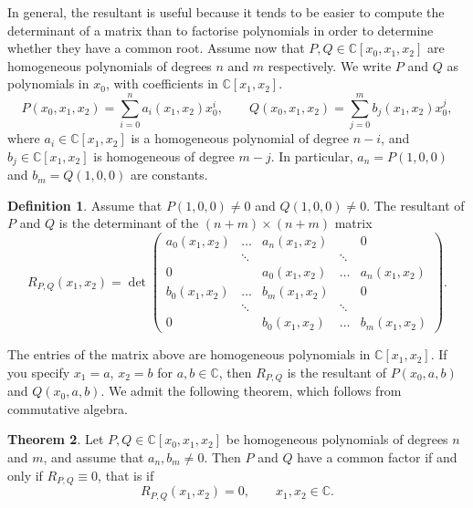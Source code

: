 \documentclass{article}
\newcommand{\C}{\mathbb{C}}
\newcommand{\rb}[1]{\left( #1 \right)}
\renewcommand{\sb}[1]{\left[ #1 \right]}
\theoremstyle{definition}\newtheorem{definition}{Definition}[section]
\theoremstyle{definition}\newtheorem{notation}[definition]{Notation}
\theoremstyle{definition}\newtheorem{remark}[definition]{Remark}
\theoremstyle{definition}\newtheorem{example}[definition]{Example}
\theoremstyle{definition}\newtheorem{fact}{Fact}
\theoremstyle{definition}\newtheorem{exercise}{Exercise}
\newtheorem{theorem}[definition]{Theorem}
\begin{document}

In general, the resultant is useful because it tends to be easier to compute the determinant of a matrix than to factorise polynomials in order to determine whether they have a common root. Assume now that $ P, Q \in \C\sb{x_0, x_1, x_2} $ are homogeneous polynomials of degrees $ n $ and $ m $ respectively. We write $ P $ and $ Q $ as polynomials in $ x_0 $, with coefficients in $ \C\sb{x_1, x_2} $.
$$ P\rb{x_0, x_1, x_2} = \sum_{i = 0}^n a_i\rb{x_1, x_2}x_0^i, \qquad Q\rb{x_0, x_1, x_2} = \sum_{j = 0}^m b_j\rb{x_1, x_2}x_0^j, $$
where $ a_i \in \C\sb{x_1, x_2} $ is a homogeneous polynomial of degree $ n - i $, and $ b_j \in \C\sb{x_1, x_2} $ is homogeneous of degree $ m - j $. In particular, $ a_n = P\rb{1, 0, 0} $ and $ b_m = Q\rb{1, 0, 0} $ are constants.

\begin{definition}
\label{def:9.5}
Assume that $ P\rb{1, 0, 0} \ne 0 $ and $ Q\rb{1, 0, 0} \ne 0 $. The resultant of $ P $ and $ Q $ is the determinant of the $ \rb{n + m} \times \rb{n + m} $ matrix
$$ R_{P, Q}\rb{x_1, x_2} = \det\begin{pmatrix} a_0\rb{x_1, x_2} & \dots & a_n\rb{x_1, x_2} & & 0 \\ & \ddots & & \ddots & \\ 0 & & a_0\rb{x_1, x_2} & \dots & a_n\rb{x_1, x_2} \\ b_0\rb{x_1, x_2} & \dots & b_m\rb{x_1, x_2} & & 0 \\ & \ddots & & \ddots & \\ 0 & & b_0\rb{x_1, x_2} & \dots & b_m\rb{x_1, x_2} \end{pmatrix}. $$
\end{definition}

The entries of the matrix above are homogeneous polynomials in $ \C\sb{x_1, x_2} $. If you specify $ x_1 = a $, $ x_2 = b $ for $ a, b \in \C $, then $ R_{P, Q} $ is the resultant of $ P\rb{x_0, a, b} $ and $ Q\rb{x_0, a, b} $. We admit the following theorem, which follows from commutative algebra.

\begin{theorem}
\label{thm:9.6}
Let $ P, Q \in \C\sb{x_0, x_1, x_2} $ be homogeneous polynomials of degrees $ n $ and $ m $, and assume that $ a_n, b_m \ne 0 $. Then $ P $ and $ Q $ have a common factor if and only if $ R_{P, Q} \equiv 0 $, that is if
$$ R_{P, Q}\rb{x_1, x_2} = 0, \qquad x_1, x_2 \in \C. $$
\end{theorem}
\end{document}
